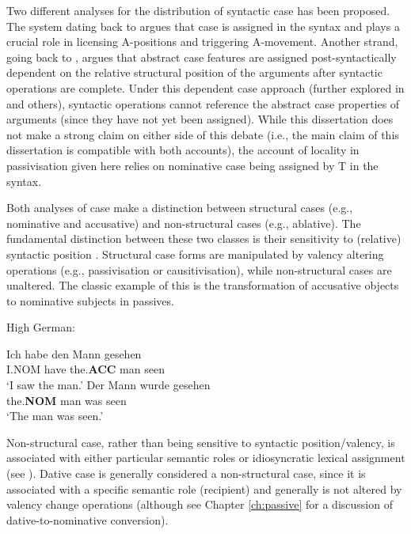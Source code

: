 Two different analyses for the distribution of syntactic case has been proposed. The system dating back to \cite{Vergnaud.1977} argues that case is assigned in the syntax and plays a crucial role in licensing A-positions and triggering A-movement. Another strand, going back to \cite{Yip.1987}, argues that abstract case features are assigned post-syntactically dependent on the relative structural position of the arguments after syntactic operations are complete. Under this dependent case approach (further explored in \citealt{Marantz.1991,McFadden.2004} and others), syntactic operations cannot reference the abstract case properties of arguments (since they have not yet been assigned). While this dissertation does not make a strong claim on either side of this debate (i.e., the main claim of this dissertation is compatible with both accounts), the account of locality in passivisation given here relies on nominative case being assigned by T in the syntax. 

Both analyses of case make a distinction between structural cases (e.g., nominative and accusative) and non-structural cases (e.g., ablative). The fundamental distinction between these two classes is their sensitivity to (relative) syntactic position \citep{Woolford.2006}. Structural case forms are manipulated by valency altering operations (e.g., passivisation or causitivisation), while non-structural cases are unaltered. The classic example of this is the transformation of accusative objects to nominative subjects in passives.

\begin{exe}
	\ex High German:\label{ex:hg-accnom}
	\begin{xlist}
		\ex \gll Ich habe den Mann gesehen\\
		I.NOM have the.\textbf{ACC} man seen\\
		\trans `I saw the man.'
		\ex \gll Der Mann wurde gesehen\\
		the.\textbf{NOM} man was seen\\
		\trans `The man was seen.'
	\end{xlist}
\end{exe}

Non-structural case, rather than being sensitive to syntactic position/valency, is associated with either particular semantic roles or idiosyncratic lexical assignment (see \citealt{Woolford.2006}). Dative case is generally considered a non-structural case, since it is associated with a specific semantic role (recipient) and generally is not altered by valency change operations (although see Chapter \ref{ch:passive} for a discussion of dative-to-nominative conversion). 

